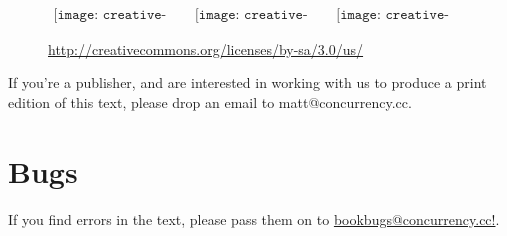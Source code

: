 \ \\

\begin{figure}[ht]
	\begin{center}$
		\begin{array}{ccc}
			\texttt{[image: creative-commons/cc]} &
			\texttt{[image: creative-commons/by]} &
			\texttt{[image: creative-commons/sa]} 
			\end{array}$
		\end{center}
		\captionsetup{labelformat=empty,justification=centering}
		\caption{\small{\url{http://creativecommons.org/licenses/by-sa/3.0/us/}}}
	\end{figure}

If you're a publisher, and are interested in working with us to produce a print edition of this text, please drop an email to {\code matt@concurrency.cc}. 

\section*{Bugs}
If you find errors in the text, please pass them on to \newline
\href{mailto:bookbugs@concurrency.cc}{\url{bookbugs@concurrency.cc!}}.
